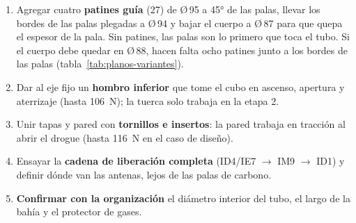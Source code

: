 \begin{resultado}
\begin{enumerate}[leftmargin=*]
  \item Agregar cuatro \textbf{patines guía} (27) de Ø\,95 a \ang{45} de las palas,
        llevar los bordes de las palas plegadas a Ø\,94 y bajar el cuerpo a Ø\,87 para
        que quepa el espesor de la pala. Sin patines, las palas son lo primero que toca el
        tubo. Si el cuerpo debe quedar en Ø\,88, hacen falta ocho patines junto a los
        bordes de las palas (tabla~\ref{tab:planos-variantes}).
  \item Dar al eje fijo un \textbf{hombro inferior} que tome el cubo en ascenso, apertura
        y aterrizaje (hasta \SI{106}{N}); la tuerca solo trabaja en la etapa 2.
  \item Unir tapas y pared con \textbf{tornillos e insertos}: la pared trabaja en tracción
        al abrir el drogue (hasta \SI{116}{N} en el caso de diseño).
  \item Ensayar la \textbf{cadena de liberación completa} (ID4/IE7 $\to$ IM9 $\to$ ID1) y
        definir dónde van las antenas, lejos de las palas de carbono.
  \item \textbf{Confirmar con la organización} el diámetro interior del tubo, el largo de
        la bahía y el protector de gases.
\end{enumerate}
\end{resultado}
